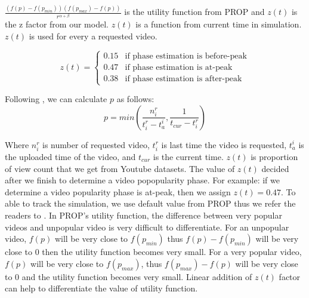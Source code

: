 \documentclass[10pt,final,journal,a4paper]{IEEEtran}
\begin{document}
$\frac{ (f(p) - f(p_{min})) (f(p_{max}) - f(p)) }{r^{\alpha + \beta}}$ is the utility function from PROP and $z(t)$ is the z factor from our model.
$z(t)$ is a function from current time in simulation. 
$z(t)$ is used for every a requested video. 

\begin{equation}
 z(t) = 
  \begin{cases}
   0.15 & \text{if phase estimation is before-peak} \\
   0.47 & \text{if phase estimation is at-peak} \\
   0.38 & \text{if phase estimation is after-peak}
  \end{cases}
\end{equation}\label{eq:zfactor}

Following \cite{1613869}, we can calculate $p$ as follows:
\begin{equation}
p = min \left(\frac{n_i^r}{t_i^r - t_a^i}  , \frac{1}{t_{cur} - t_i^r}\right)
\end{equation}

Where $n_i^r$ is number of requested video, $t_i^r$ is last time the video is requested, $t_a^i$ is the uploaded time of the video, and $t_{cur}$ is the current time.
$z(t)$ is proportion of view count that we get from Youtube datasets.  
The value of $z(t)$ decided after we finish to determine a video popopularity phase.  
For example: if we determine a video popularity phase is at-peak, then we assign $z(t)=0.47$.
To able to track the simulation, we use default value from PROP thus we refer the readers to \cite{1613869}.
In PROP's utility function, the difference between very popular videos and unpopular video is very difficult to differentiate. 
For an unpopular video, $f(p)$ will be very close to $f(p_{min})$ thus $f(p) - f(p_{min})$ will be very close to $0$ then the utility function becomes very small.
For a very popular video, $f(p)$ will be very close to $f(p_{max})$, thus $f(p_{max}) - f(p)$ will be very close to $0$ and the  utility function becomes very small.  
Linear addition of $z(t)$ factor can help to differentiate the value of utility function.
\end{document}
